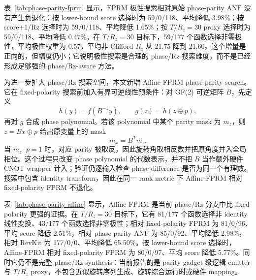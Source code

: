 \documentclass[UTF8,fontset=macnew,11pt]{ctexart}
\newcommand{\anf}{\ensuremath{\mathrm{ANF}}}
\newcommand{\fprm}{\ensuremath{\mathrm{FPRM}}}
\newcommand{\xor}{\ensuremath{\oplus}}
\newcommand{\rz}{\ensuremath{R_z}}
\begin{document}
\begin{table}[H]
\centering
\small
\caption{Fixed-polarity phase-parity search。每个函数枚举全部 $2^n$ 个极性，按 lower-bound score、score+1/Rz 和 $T/R_z=30$ proxy 三个目标分别选择最优极性；共 531 行全部 up-to-global-phase 验证通过。}
\label{tab:phase-parity-fprm}

\end{table}

表~\ref{tab:phase-parity-fprm} 显示，\fprm{} 极性搜索相对原始 phase-parity \anf{} 没有产生负退化：按 lower-bound score 选择时为 59/0/118、平均降低 3.98\%；按 score+1/Rz 选择时为 59/0/118、平均降低 1.65\%；按 $T/R_z=30$ proxy 选择时为 59/0/118、平均降低 0.47\%。在 $T/R_z=30$ 目标下，59/177 个函数选择非零极性，平均极性权重为 0.57，平均非 Clifford \rz{} 从 21.75 降到 21.60。这个增量是正向的，但幅度仍小；它说明极性搜索是合理的 phase/Rz 搜索维度，而不是已经形成足够强的 phase/Rz-aware 方法。

为进一步扩大 phase/Rz 搜索空间，本文新增 Affine-FPRM phase-parity search。它在 fixed-polarity 搜索前加入有界可逆线性预条件：对 GF(2) 可逆矩阵 $B$，先定义
\begin{equation}
  h(y)=f(B^{-1}y),\qquad g(z)=h(z\xor p),
\end{equation}
再对 $g$ 合成 phase polynomial。若该 polynomial 中某个 parity mask 为 $m_z$，则 $z=Bx\xor p$ 给出原变量上的 mask
\begin{equation}
  m_x=B^T m_z .
\end{equation}
当 $m_z\cdot p=1$ 时，对应 parity 被取反，因此旋转角取相反数并把原角度并入全局相位。这个过程只改变 phase polynomial 的代数表示，并不把 $B$ 当作额外硬件 CNOT wrapper 计入；验证仍逐输入检查 phase difference 是否为同一个有理数。搜索中包含 identity transform，因此在同一 rank metric 下 Affine-FPRM 相对 fixed-polarity FPRM 不退化。

\begin{table}[H]
\centering
\small
\caption{Affine-FPRM phase-parity search 的资源比较。每个函数搜索至多 32 个可逆线性变换，并在每个变换下枚举全部极性；共 531 行 selected results 全部 up-to-global-phase 验证通过。}
\label{tab:phase-parity-affine}

\end{table}

表~\ref{tab:phase-parity-affine} 显示，Affine-FPRM 是当前 phase/Rz 分支中比 fixed-polarity 更强的证据。在 $T/R_z=30$ 目标下，它有 81/177 个函数选择非 identity 线性变换、43/177 个函数选择非零极性；相对 fixed-polarity FPRM 为 81/0/96、平均 score 降低 2.51\%，相对 phase-parity \anf{} 为 85/0/92、平均降低 2.98\%，相对 RevKit 为 177/0/0、平均降低 65.50\%。按 lower-bound score 选择时，Affine-FPRM 相对 fixed-polarity FPRM 为 80/0/97、平均 score 降低 5.77\%。同时它仍不是完整 phase/Rz synthesis：当前报告的是 parity-gadget 级逻辑 emitter 与 $T/R_z$ proxy，不包含近似旋转序列生成、旋转综合运行时或硬件 mapping。
\end{document}
